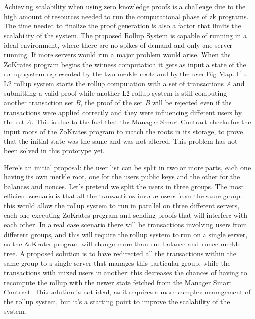 Achieving scalability when using zero knowledge proofs is a challenge due to the high amount of resources needed to run the computational phase of zk programs. The time needed to finalize the proof generation is also a factor that limits the scalability of the system. The proposed Rollup System is capable of running in a ideal environment, where there are no spikes of demand and only one server running. If more servers would run a major problem would arise. When the ZoKrates program begins the witness computation it gets as input a state of the rollup system represented by the two merkle roots and by the user Big Map. If a L2 rollup system starts the rollup computation with a set of transactions \textit{A} and submitting a valid proof while another L2 rollup system is still computing another transaction set \textit{B}, the proof of the set \textit{B} will be rejected even if the transactions were applied correctly and they were influencing different users by the set \textit{A}. This is due to the fact that the Manager Smart Contract checks for the input roots of the ZoKrates program to match the roots in its storage, to prove that the initial state was the same and was not altered. This problem has not been solved in this prototype yet.

Here's an initial proposal: the user list can be split in two or more parts, each one having its own merkle root, one for the users public keys and the other for the balances and nonces. Let's pretend we split the users in three groups. The most efficient scenario is that all the transactions involve users from the same group: this would allow the rollup system to run in parallel on three different servers, each one executing ZoKrates program and sending proofs that will interfere with each other. In a real case scenario there will be transactions involving users from different groups, and this will require the rollup system to run on a single server, as the ZoKrates program will change more than one balance and nonce merkle tree. A proposed solution is to have redirected all the transactions within the same group to a single server that manages this particular group, while the transactions with mixed users in another; this decreases the chances of having to recompute the rollup with the newer state fetched from the Manager Smart Contract. This solution is not ideal, as it requires a more complex management of the rollup system, but it's a starting point to improve the scalability of the system.